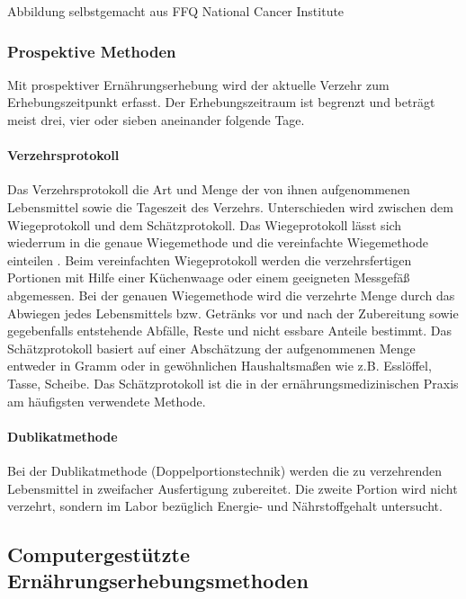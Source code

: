 Abbildung selbstgemacht aus FFQ National Cancer Institute

\subsubsection{Prospektive Methoden}

Mit  prospektiver Ernährungserhebung wird der aktuelle Verzehr zum Erhebungszeitpunkt erfasst. Der Erhebungszeitraum ist begrenzt und beträgt meist drei, vier oder sieben aneinander folgende Tage. 

\paragraph{Verzehrsprotokoll}

Das Verzehrsprotokoll die Art und Menge der von ihnen aufgenommenen Lebensmittel sowie die Tageszeit des Verzehrs. Unterschieden wird zwischen dem Wiegeprotokoll und dem Schätzprotokoll. 
Das Wiegeprotokoll lässt sich wiederrum in die genaue Wiegemethode und die vereinfachte Wiegemethode einteilen \cite{sichert1984ernaehrungs}. Beim vereinfachten Wiegeprotokoll werden die verzehrsfertigen Portionen mit Hilfe einer Küchenwaage oder einem geeigneten Messgefäß abgemessen. Bei der genauen Wiegemethode wird die verzehrte Menge durch das Abwiegen jedes Lebensmittels bzw. Getränks vor und nach der Zubereitung sowie gegebenfalls entstehende Abfälle, Reste und nicht essbare Anteile bestimmt. \cite{PHN:587344} Das Schätzprotokoll basiert auf einer Abschätzung der aufgenommenen Menge entweder in Gramm oder in gewöhnlichen Haushaltsmaßen wie z.B. Esslöffel, Tasse, Scheibe.
Das Schätzprotokoll ist die in der ernährungsmedizinischen Praxis am häufigsten verwendete Methode. \cite{muller2007ernahrungsmedizinische}


\paragraph{Dublikatmethode}

Bei der Dublikatmethode (Doppelportionstechnik) werden die zu verzehrenden Lebensmittel in zweifacher Ausfertigung zubereitet. Die zweite Portion wird nicht verzehrt, sondern im Labor bezüglich Energie- und Nährstoffgehalt untersucht. 

\subsection{Computergestützte Ernährungserhebungsmethoden}

